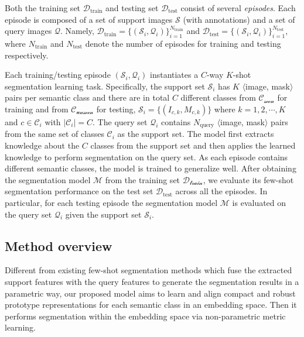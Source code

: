 \documentclass[10pt,twocolumn,letterpaper]{article}
\begin{document}
 
Both the training set $\mathcal{D}_{\text{train}}$ and testing set $\mathcal{D}_{\text{test}}$ consist of several \textit{episodes}.  Each episode is composed of a set of support images  $\mathcal{S}$ (with annotations) and a set of query images $\mathcal{Q}$.  Namely, $\mathcal{D}_{\text{train}}=\{(\mathcal{S}_i, \mathcal{Q}_i)\}_{i=1}^{N_{\text{train}}}$ and $\mathcal{D}_{\text{test}}=\{(\mathcal{S}_i, \mathcal{Q}_i)\}_{i=1}^{N_{\text{test}}}$, where $N_{\text{train}}$ and $N_{\text{test}}$ denote the number of episodes for training and testing respectively. 

Each training/testing episode $(\mathcal{S}_i, \mathcal{Q}_i)$ instantiates a $C$-way $K$-shot segmentation learning task. Specifically, the support set $\mathcal{S}_i$ has $K$ $\langle$image, mask$\rangle$ pairs per semantic class and there are in total $C$ different classes from $\mathcal{C_{\text{seen}}}$ for training and from $\mathcal{C_{\text{unseen}}}$ for testing, \ie $\mathcal{S}_i=\{(I_{c,k}, M_{c,k})\}$ where $k=1,2,\cdots,K$ and $c\in\mathcal{C}_i$ with $|\mathcal{C}_i|=C$.
The query set $\mathcal{Q}_i$ contains $N_{\text{query}}$ $\langle$image, mask$\rangle$ pairs from the same set of classes $\mathcal{C}_i$ as the support set. The model first extracts knowledge about the $C$ classes from the support set and then applies the learned knowledge to perform segmentation on the query set. As each episode contains different semantic classes, the model is trained to generalize well.
After obtaining the segmentation model $\mathcal{M}$ from the training set $\mathcal{D_{\text{train}}}$, we evaluate its few-shot segmentation performance on the test set $\mathcal{D}_{\text{test}}$ across all the episodes. In particular, for each testing episode the segmentation model $\mathcal{M}$ is evaluated on the query set $\mathcal{Q}_i$ given the support set $\mathcal{S}_i$.

\subsection{Method overview}

Different from existing few-shot segmentation methods which fuse the extracted support features with the query features to generate the segmentation results in a parametric way, our proposed model aims to learn and align compact and robust prototype representations for each semantic class in an embedding space. Then it performs segmentation within the embedding space via non-parametric metric learning.
\end{document}
